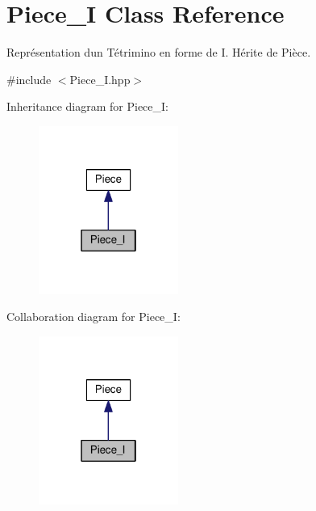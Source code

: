 \hypertarget{classPiece__I}{}\section{Piece\+\_\+I Class Reference}
\label{classPiece__I}


Représentation d\textquotesingle{}un Tétrimino en forme de I. Hérite de Pièce.  




{\ttfamily \#include $<$Piece\+\_\+\+I.\+hpp$>$}



Inheritance diagram for Piece\+\_\+I\+:
\nopagebreak
\begin{figure}[H]
\begin{center}
\leavevmode
\includegraphics[width=130pt]{classPiece__I__inherit__graph}
\end{center}
\end{figure}


Collaboration diagram for Piece\+\_\+I\+:
\nopagebreak
\begin{figure}[H]
\begin{center}
\leavevmode
\includegraphics[width=130pt]{classPiece__I__coll__graph}
\end{center}
\end{figure}
